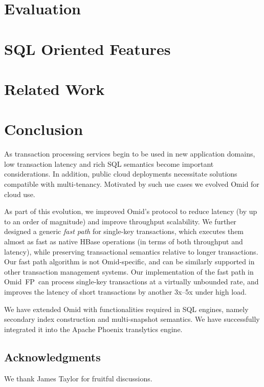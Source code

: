 \documentclass{vldb}
\newcommand{\sys}{Omid~FP}
\begin{document}
\section{Evaluation} \label{sec:eval}


\vspace{-0.3cm}
\section{SQL Oriented Features} \label{sec:sql}

\vspace{-0.3cm}
\section{Related Work} \label{sec:related}

\vspace{-0.3cm}
\section{Conclusion} \label{sec:conclusions}
\vspace{-0.1cm}

As transaction processing services begin to be used in 
new application domains, low transaction latency and rich SQL semantics
become important considerations. In addition, public cloud deployments 
necessitate solutions compatible with multi-tenancy.
Motivated by such use cases we evolved Omid for cloud use.

As part of this evolution, we
improved Omid's protocol to reduce latency (by up to an order of magnitude) and improve throughput scalability.
%
We further designed a generic \emph{fast path} for single-key transactions, 
which executes them  almost as fast as native HBase operations (in terms of 
both throughput and latency), while preserving
transactional semantics relative to longer transactions.
Our fast path algorithm is not Omid-specific, and can be similarly supported in 
other transaction management systems.
Our implementation of the fast path in \sys\ can process single-key
transactions  at a virtually unbounded rate, and improves the latency of short transactions
by another 3x--5x under high load.

We have extended Omid with functionalities required in SQL engines, namely 
secondary index construction and multi-snapshot semantics. 
We have successfully integrated it into the Apache Phoenix translytics engine. 

\subsection*{Acknowledgments}
We thank James Taylor for fruitful discussions. 

\newpage




\end{document}
